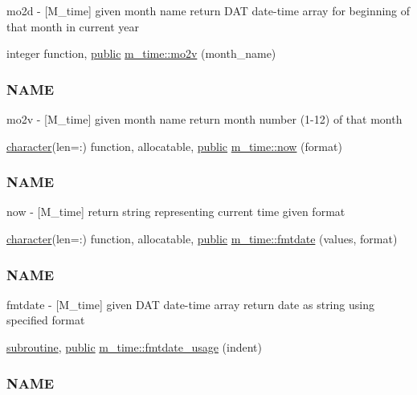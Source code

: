\begin{DoxyCompactItemize}
\begin{DoxyCompactList}
mo2d -\/ \mbox{[}M\+\_\+time\mbox{]} given month name return D\+AT date-\/time array for beginning of that month in current year \end{DoxyCompactList}\item 
integer function, \hyperlink{M__stopwatch_83_8txt_a2f74811300c361e53b430611a7d1769f}{public} \hyperlink{namespacem__time_ad7bf0886754757e8961e562f06cf3bb7}{m\+\_\+time\+::mo2v} (month\+\_\+name)
\begin{DoxyCompactList}\small\item\em \subsubsection*{N\+A\+ME}

mo2v -\/ \mbox{[}M\+\_\+time\mbox{]} given month name return month number (1-\/12) of that month \end{DoxyCompactList}\item 
\hyperlink{option__stopwatch_83_8txt_abd4b21fbbd175834027b5224bfe97e66}{character}(len=\+:) function, allocatable, \hyperlink{M__stopwatch_83_8txt_a2f74811300c361e53b430611a7d1769f}{public} \hyperlink{namespacem__time_a6b5e87be0e510ff268c1ecfbf67a3bdb}{m\+\_\+time\+::now} (format)
\begin{DoxyCompactList}\small\item\em \subsubsection*{N\+A\+ME}

now -\/ \mbox{[}M\+\_\+time\mbox{]} return string representing current time given format \end{DoxyCompactList}\item 
\hyperlink{option__stopwatch_83_8txt_abd4b21fbbd175834027b5224bfe97e66}{character}(len=\+:) function, allocatable, \hyperlink{M__stopwatch_83_8txt_a2f74811300c361e53b430611a7d1769f}{public} \hyperlink{namespacem__time_a2cb84c9b8af4f395b76aed76e1431328}{m\+\_\+time\+::fmtdate} (values, format)
\begin{DoxyCompactList}\small\item\em \subsubsection*{N\+A\+ME}

fmtdate -\/ \mbox{[}M\+\_\+time\mbox{]} given D\+AT date-\/time array return date as string using specified format \end{DoxyCompactList}\item 
\hyperlink{M__stopwatch_83_8txt_acfbcff50169d691ff02d4a123ed70482}{subroutine}, \hyperlink{M__stopwatch_83_8txt_a2f74811300c361e53b430611a7d1769f}{public} \hyperlink{namespacem__time_a914927f70fb9495af1be2e484b967111}{m\+\_\+time\+::fmtdate\+\_\+usage} (indent)
\begin{DoxyCompactList}\small\item\em \subsubsection*{N\+A\+ME}


\end{DoxyCompactList}
\end{DoxyCompactItemize}
